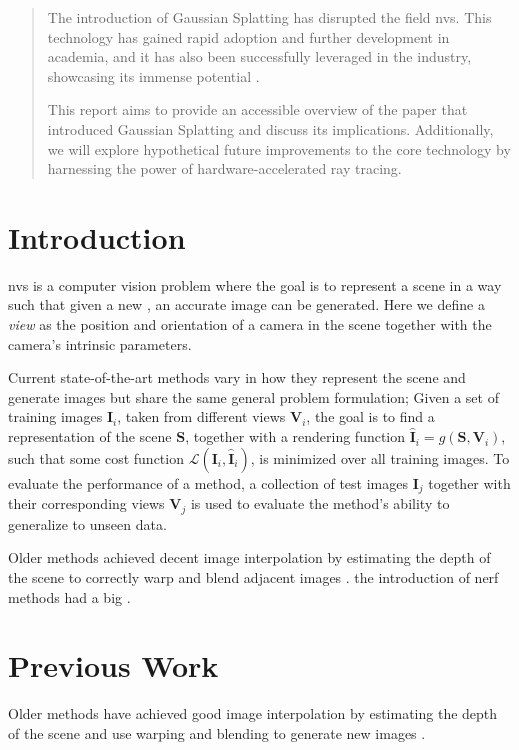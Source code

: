 \begin{abstract}
    The introduction of Gaussian Splatting has disrupted the field \gls{nvs}. This technology has gained rapid adoption and further development in academia, and it has also been successfully leveraged in the industry, showcasing its immense potential \cite{LumaAIVideo}.

    This report aims to provide an accessible overview of the paper that introduced Gaussian Splatting and discuss its implications.
    Additionally, we will explore hypothetical future improvements to the core technology by harnessing the power of hardware-accelerated ray tracing.


\end{abstract}

\section{Introduction}
\gls{nvs} is a computer vision problem where the goal is to represent a scene in a way such that given a new , an accurate image can be generated.
Here we define a \textit{view} as the position and orientation of a camera in the scene together with the camera's intrinsic parameters.

Current state-of-the-art methods vary in how they represent the scene and generate images
but share the same general problem formulation;
Given a set of training images $\mathbf{I}_i$,
taken from different views $\mathbf{V}_i$,
the goal is to find a representation of the scene $\mathbf{S}$,
together with a rendering function $\mathbf{\hat{I}}_i = g(\mathbf{S}, \mathbf{V}_i)$,
such that some cost function $\mathcal{L}(\mathbf{I}_i, \mathbf{\hat{I}}_i)$,
is minimized over all training images.
To evaluate the performance of a method, a collection of test images $\mathbf{I}_j$ together with their corresponding views $\mathbf{V}_j$ is used to evaluate the method's ability to generalize to unseen data.





Older methods achieved decent image interpolation by estimating the depth of the scene to correctly warp and blend adjacent images \cite{zitnickHighqualityVideoView2004}.
the introduction of \gls{nerf} methods had a big  \cite{mildenhallNeRFRepresentingScenes2020a}.





\section{Previous Work}
Older methods have achieved good image interpolation by estimating the depth of the scene and use warping and blending to generate new images \cite{zitnickHighqualityVideoView2004}.

